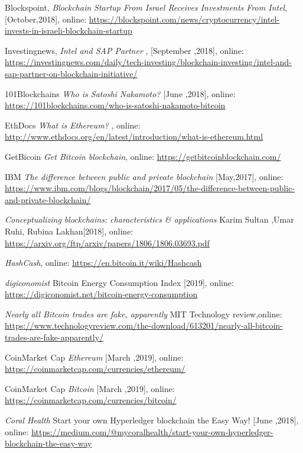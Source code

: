 \begin{thebibliography}{99}
 Blockspoint, 
\textit{Blockchain Startup From Israel Receives Investments From Intel}, [October,2018], online: \url{https://blockspoint.com/news/cryptocurrency/intel-invests-in-israeli-blockchain-startup}

 Investingnews, \textit{Intel and SAP Partner} , [September ,2018], online: \url{https://investingnews.com/daily/tech-investing/blockchain-investing/intel-and-sap-partner-on-blockchain-initiative/}


 101Blockchains 
\textit{Who is Satoshi Nakamoto?} [June ,2018], online: 
\url{https://101blockchains.com/who-is-satoshi-nakamoto-bitcoin}

 EthDocs
\textit{What is Ethereum?} , online: 
\url{http://www.ethdocs.org/en/latest/introduction/what-is-ethereum.html}

 GetBicoin
\textit{Get Bitcoin blockchain}, online: 
\url{https://getbitcoinblockchain.com/}

 IBM \textit{The difference between public and private blockchain} [May,2017], online: \url{https://www.ibm.com/blogs/blockchain/2017/05/the-difference-between-public-and-private-blockchain/}


\textit{Conceptualizing blockchains: characteristics & applications }  Karim Sultan ,Umar Ruhi, Rubina Lakhan[2018], online: 
\url{https://arxiv.org/ftp/arxiv/papers/1806/1806.03693.pdf}

\textit{HashCash}, online: 
\url{https://en.bitcoin.it/wiki/Hashcash}



\textit{digiconomist}  Bitcoin Energy Consumption Index [2019], online: 
\url{https://digiconomist.net/bitcoin-energy-consumption}


\textit{Nearly all Bitcoin trades are fake, apparently} MIT Technology review,online:
\url{https://www.technologyreview.com/the-download/613201/nearly-all-bitcoin-trades-are-fake-apparently/}


  CoinMarket Cap
\textit{Ethereum}  [March ,2019], online: 
\url{https://coinmarketcap.com/currencies/ethereum/}

  CoinMarket Cap
\textit{Bitcoin}  [March ,2019], online: 
\url{https://coinmarketcap.com/currencies/bitcoin/}

\textit{Coral Health} Start your own Hyperledger blockchain the Easy Way! [June ,2018], online: 
\url{https://medium.com/@mycoralhealth/start-your-own-hyperledger-blockchain-the-easy-way}


\end{thebibliography}
